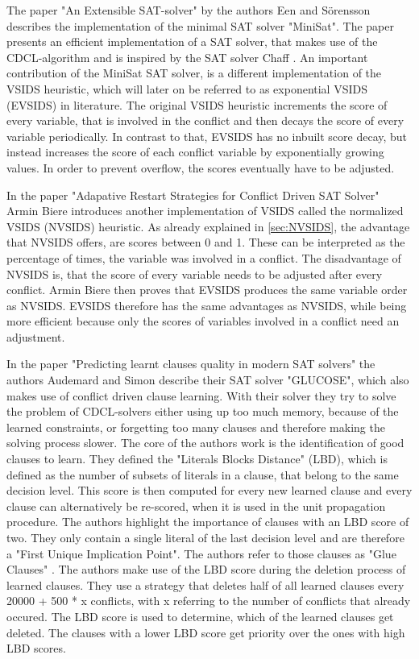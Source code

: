 The paper "An Extensible SAT-solver" \cite{een2003extensible} by the authors Een and Sörensson describes the implementation of the minimal SAT solver "MiniSat". The paper presents an efficient implementation of a SAT solver, that makes use of the CDCL-algorithm and is inspired by the SAT solver Chaff \cite{moskewicz2001chaff}. An important contribution of the MiniSat SAT solver, is a different implementation of the VSIDS heuristic, which will later on be referred to as exponential VSIDS (EVSIDS) in literature. The original VSIDS heuristic increments the score of every variable, that is involved in the conflict and then decays the score of every variable periodically. In contrast to that, EVSIDS has no inbuilt score decay, but instead increases the score of each conflict variable by exponentially growing values. In order to prevent overflow, the scores eventually have to be adjusted.

In the paper "Adapative Restart Strategies for Conflict Driven SAT Solver" \cite{biere2008adaptive} Armin Biere introduces another implementation of VSIDS called the normalized VSIDS (NVSIDS) heuristic. As already explained in \ref{sec:NVSIDS}, the advantage that NVSIDS offers, are scores between 0 and 1. These can be interpreted as the percentage of times, the variable was involved in a conflict. The disadvantage of NVSIDS is, that the score of every variable needs to be adjusted after every conflict. Armin Biere then proves that EVSIDS produces the same variable order as NVSIDS. EVSIDS therefore has the same advantages as NVSIDS, while being more efficient because only the scores of variables involved in a conflict need an adjustment.

In the paper "Predicting learnt clauses quality in modern SAT solvers" \cite{audemard2009predicting} the authors Audemard and Simon describe their SAT solver "GLUCOSE", which also makes use of conflict driven clause learning. With their solver they try to solve the problem of CDCL-solvers either using up too much memory, because of the learned constraints, or forgetting too many clauses and therefore making the solving process slower. The core of the authors work is the identification of good clauses to learn. They defined the "Literals Blocks Distance" (LBD), which is defined as the number of subsets of literals in a clause, that belong to the same decision level. This score is then computed for every new learned clause and every clause can alternatively be re-scored, when it is used in the unit propagation procedure. The authors highlight the importance of clauses with an LBD score of two. They only contain a single literal of the last decision level and are therefore a "First Unique Implication Point". The authors refer to those clauses as "Glue Clauses" \cite{audemard2009predicting}. The authors make use of the LBD score during the deletion process of learned clauses. They use a strategy that deletes half of all learned clauses every 20000 + 500 * x conflicts, with x referring to the number of conflicts that already occured. The LBD score is used to determine, which of the learned clauses get deleted. The clauses with a lower LBD score get priority over the ones with high LBD scores.

